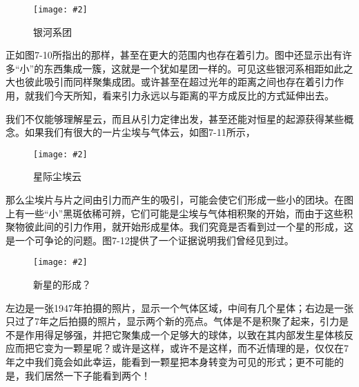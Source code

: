 \documentclass[12pt,oneside]{book}
\newenvironment{linefig}[2][1]
{\begin{figure}[H]
\centering
\texttt{[image: \#2]}}
{\end{figure}}
\begin{document}
\begin{linefig}{银河系团}
\caption{银河系团}
\label{fig:银河系团}
\end{linefig}
正如图7-10所指出的那样，甚至在更大的范围内也存在着引力。图中还显示出有许多“小”的东西集成一簇，这就是一个犹如星团一样的。可见这些银河系相距如此之大也彼此吸引而同样聚集成团。或许甚至在超过光年的距离之间也存在着引力作用，就我们今天所知，看来引力永远以与距离的平方成反比的方式延伸出去。

我们不仅能够理解星云，而且从引力定律出发，甚至还能对恒星的起源获得某些概念。如果我们有很大的一片尘埃与气体云，如图7-11所示，
\begin{linefig}{星际尘埃云}
\caption{星际尘埃云}
\label{fig:星际尘埃云}
\end{linefig}
那么尘埃片与片之间由引力而产生的吸引，可能会使它们形成一些小的团块。在图上有一些“小”黑斑依稀可辨，它们可能是尘埃与气体相积聚的开始，而由于这些积聚物彼此间的引力作用，就开始形成星体。我们究竟是否看到过一个星的形成，这是一个可争论的问题。图7-12提供了一个证据说明我们曾经见到过。
\begin{linefig}{新星的形成？}
\caption{新星的形成？}
\label{fig:新星的形成？}
\end{linefig}
左边是一张1947年拍摄的照片，显示一个气体区域，中间有几个星体；右边是一张只过了7年之后拍摄的照片，显示两个新的亮点。气体是不是积聚了起来，引力是不是作用得足够强，并把它聚集成一个足够大的球体，以致在其内部发生星体核反应而把它变为一颗星呢？或许是这样，或许不是这样，而不近情理的是，仅仅在7年之中我们竟会如此幸运，能看到一颗星把本身转变为可见的形式；更不可能的是，我们居然一下子能看到两个！
\end{document}

